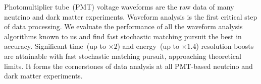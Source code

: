 Photomultiplier tube~(PMT) voltage waveforms are the raw data of many neutrino and dark matter experiments. Waveform analysis is the first critical step of data processing. We evaluate the performance of all the waveform analysis algorithms known to us and find fast stochastic matching pursuit the best in accuracy. Significant time~(up to $\times 2$) and energy~(up to $\times 1.4$) resolution boosts are attainable with fast stochastic matching pursuit, approaching theoretical limits.  It forms the cornerstones of data analysis at all PMT-based neutrino and dark matter experiments.